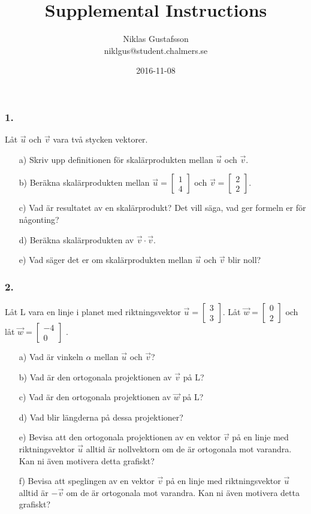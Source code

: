 \documentclass{article}
\title{Supplemental Instructions}
\author{Niklas Gustafsson \\ 
		\small{niklgus@student.chalmers.se}
}
\date{
      2016-11-08
     }
\begin{document}
\maketitle
\subsubsection*{1.}
Låt $\vec{u}$ och $\vec{v}$ vara två stycken vektorer.
\begin{itemize}
\item[a) ] Skriv upp definitionen för skalärprodukten mellan $\vec{u}$ och $\vec{v}$.
\item[b) ] Beräkna skalärprodukten mellan $\vec{u} = \begin{bmatrix} 1 \\ 4 \end{bmatrix}$ och $\vec{v} = \begin{bmatrix} 2 \\ 2 \end{bmatrix}.$
\item[c) ] Vad är resultatet av en skalärprodukt? Det vill säga, vad ger formeln er för någonting?
\item[d) ] Beräkna skalärprodukten av $\vec{v} \cdot \vec{v}$.
\item[e) ] Vad säger det er om skalärprodukten mellan $\vec{u}$ och $\vec{v}$ blir noll?
\end{itemize}

\subsubsection*{2.}
Låt L vara en linje i planet med riktningsvektor $\vec{u} = \begin{bmatrix} 3 \\ 3 \end{bmatrix}$. Låt $\vec{w} = \begin{bmatrix} 0 \\ 2 \end{bmatrix}$ och låt $\vec{w} = \begin{bmatrix} -4 \\ 0 \end{bmatrix}$ .
\begin{itemize}
\item[a) ] Vad är vinkeln $\alpha$ mellan $\vec{u}$ och $\vec{v}$?
\item[b) ] Vad är den ortogonala projektionen av $\vec{v}$ på L?
\item[c) ] Vad är den ortogonala projektionen av $\vec{w}$ på L?
\item[d) ] Vad blir längderna på dessa projektioner?
\item[e) ] Bevisa att den ortogonala projektionen av en vektor $\vec{v}$ på en linje med riktningsvektor $\vec{u}$ alltid är nollvektorn om de är ortogonala mot varandra. Kan ni även motivera detta grafiskt? 
\item[f) ] Bevisa att speglingen av en vektor $\vec{v}$ på en linje med riktningsvektor $\vec{u}$ alltid är $-\vec{v}$ om de är ortogonala mot varandra. Kan ni även motivera detta grafiskt?
\end{itemize}   
\end{document}
